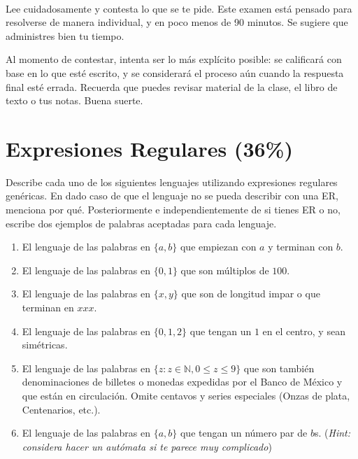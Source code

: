 \documentclass[8pt, onside]{article}
\title{
    \myclass \\
    \textbf{\mytitle} \\
    \myheader
    \date{}
}
\begin{document}
\maketitle

\vspace{-1.5cm}

Lee cuidadosamente y contesta lo que se te pide.
Este examen está pensado para resolverse de manera individual, y en poco menos de 90 minutos.
Se sugiere que administres bien tu tiempo.

Al momento de contestar, intenta ser lo más explícito posible: se calificará con base en lo que esté escrito, y se considerará el proceso aún cuando la respuesta final esté errada.
Recuerda que puedes revisar material de la clase, el libro de texto o tus notas.
Buena suerte.

\section{Expresiones Regulares (36\%)}

Describe cada uno de los siguientes lenguajes utilizando expresiones regulares genéricas. En dado caso de que el lenguaje no se pueda describir con una ER, menciona por qué. Posteriormente e independientemente de si tienes ER o no, escribe dos ejemplos de palabras aceptadas para cada lenguaje.

\begin{enumerate}[label=\tt \alph*)]
    \itemsep0em
    \item El lenguaje de las palabras en $\{a,b\}$ que empiezan con $a$ y terminan con $b$.
    \item El lenguaje de las palabras en $\{0,1\}$ que son múltiplos de $100$.
    \item El lenguaje de las palabras en $\{x, y\}$ que son de longitud impar o que terminan en $xxx$.
    \item El lenguaje de las palabras en $\{0,1,2\}$ que tengan un $1$ en el centro, y sean simétricas.
    \item El lenguaje de las palabras en $\{z : z \in \mathbb{N}, 0 \leq z \leq 9\}$ que son también denominaciones de billetes o monedas expedidas por el Banco de México y que están en circulación. Omite centavos y series especiales (Onzas de plata, Centenarios, etc.).
    \item El lenguaje de las palabras en $\{a,b\}$ que tengan un número par de $b$s. (\textit{Hint: considera hacer un autómata si te parece muy complicado})
\end{enumerate}
\end{document}
